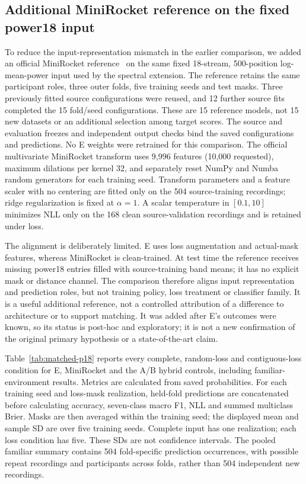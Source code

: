 \subsection*{Additional MiniRocket reference on the fixed power18 input}
\label{sec:matched-p18}

To reduce the input-representation mismatch in the earlier comparison, we
added an official MiniRocket reference~\cite{dempster2021} on the same fixed
18-stream, 500-position log-mean-power input used by the spectral extension.
The reference retains the same participant roles, three outer folds, five
training seeds and test masks. Three previously fitted source configurations
were reused, and 12 further source fits completed the 15 fold/seed
configurations. These are 15 reference models, not 15 new datasets or an
additional selection among target scores. The source and evaluation freezes
and independent output checks bind the saved configurations and predictions.
No E weights were retrained for this comparison. The official multivariate MiniRocket transform uses 9,996 features (10,000 requested), maximum dilations per kernel 32, and separately reset NumPy and Numba random generators for each training seed. Transform parameters and a feature scaler with no centering are fitted only on the 504 source-training recordings; ridge regularization is fixed at $\alpha=1$. A scalar temperature in $[0.1,10]$ minimizes NLL only on the 168 clean source-validation recordings and is retained under loss.

The alignment is deliberately limited. E uses loss augmentation and
actual-mask features, whereas MiniRocket is clean-trained. At test time the
reference receives missing power18 entries filled with source-training band
means; it has no explicit mask or distance channel. The comparison therefore
aligns input representation and prediction roles, but not training policy,
loss treatment or classifier family. It is a useful additional reference,
not a controlled attribution of a difference to architecture or to support
matching. It was added after E's outcomes were known, so its status is
post-hoc and exploratory; it is not a new confirmation of the original
primary hypothesis or a state-of-the-art claim.

Table~\ref{tab:matched-p18} reports every complete, random-loss and
contiguous-loss condition for E, MiniRocket and the A/B hybrid controls,
including familiar-environment results. Metrics are calculated from saved
probabilities. For each training seed and loss-mask realization, held-fold
predictions are concatenated before calculating accuracy, seven-class macro
F1, NLL and summed multiclass Brier. Masks are then averaged within the
training seed; the displayed mean and sample SD are over five training
seeds. Complete input has one realization; each loss condition has five.
These SDs are not confidence intervals. The pooled familiar summary contains
504 fold-specific prediction occurrences, with possible repeat recordings
and participants across folds, rather than 504 independent new recordings.

